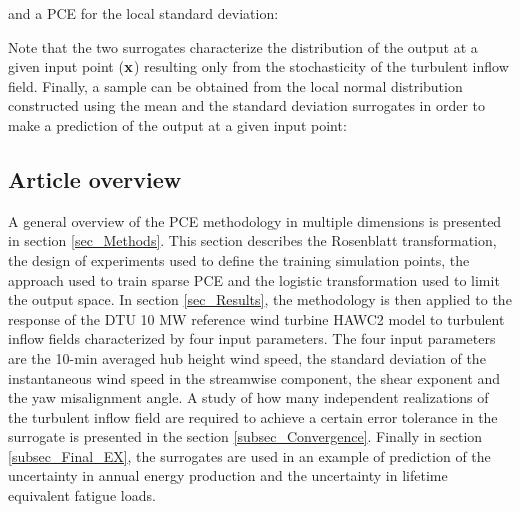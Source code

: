 \documentclass[preprint,12pt]{elsarticle}
\begin{document}

\noindent and a PCE for the local standard deviation:

Note that the two surrogates characterize the distribution of the output at a given input point ($\mathbf{x}$) resulting only from the stochasticity of the turbulent inflow field. Finally, a sample can be obtained from the local normal distribution constructed using the mean and the standard deviation surrogates in order to make a prediction of the output at a given input point:


\subsection{Article overview}
A general overview of the PCE methodology in multiple dimensions is presented in section \ref{sec_Methods}. This section describes the Rosenblatt transformation, the design of experiments used to define the training simulation points, the approach used to train sparse PCE and the logistic transformation used to limit the output space. In section \ref{sec_Results}, the methodology is then applied to the response of the DTU 10 MW reference wind turbine HAWC2 model \cite{bak2012light}  to turbulent inflow fields characterized by four input parameters. The four input parameters are the 10-min averaged hub height wind speed, the standard deviation of the instantaneous wind speed in the streamwise component, the shear exponent and the yaw misalignment angle. A study of how many independent realizations of the turbulent inflow field are required to achieve a certain error tolerance in the surrogate is presented in the section \ref{subsec_Convergence}. Finally in section \ref{subsec_Final_EX}, the surrogates are used in an example of prediction of the uncertainty in annual energy production and the uncertainty in lifetime equivalent fatigue loads.
\end{document}
